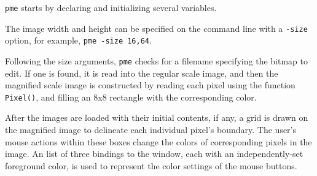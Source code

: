 \bigskip

\texttt{pme} starts by declaring and initializing several variables.

\bigskip


The image width and height can be specified on the command line with a
\texttt{-size} option, for example, \texttt{pme -size 16,64}.


Following the size arguments, \texttt{pme} checks for a filename
specifying the bitmap to edit. If one is found, it is read into the
regular scale image, and then the magnified scale image is constructed
by reading each pixel using the function \texttt{Pixel()}, and filling
an 8x8 rectangle with the corresponding color.


After the images are loaded with their initial contents, if any, a
grid is drawn on the magnified image to delineate each individual
pixel's boundary. The user's mouse actions within these boxes change
the colors of corresponding pixels in the image. An list of three
bindings to the window, each with an independently-set foreground
color, is used to represent the color settings of the mouse buttons.

